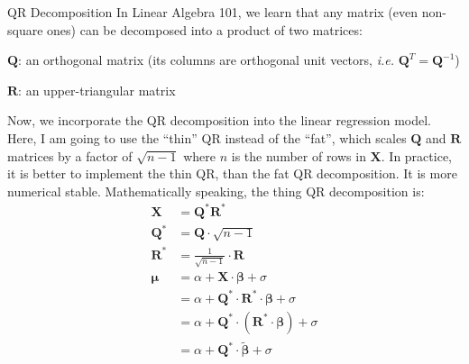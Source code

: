 \documentclass[aspectratio=169]{beamer}                    %
\begin{document}
\begin{frame}[plain, noframenumbering, label=appendixnqr]{QR Decomposition}
	\footnotesize
	In Linear Algebra 101, we learn that any matrix
	(even non-square ones) can be decomposed into a product of two matrices:
	\begin{vfilleditems}
		\footnotesize
		\item $\mathbf{Q}$: an orthogonal matrix (its columns are orthogonal unit vectors,
		\textit{i.e.} $\mathbf{Q}^T = \mathbf{Q}^{-1}$)
		\item $\mathbf{R}$: an upper-triangular matrix
	\end{vfilleditems}
	\footnotesize
	Now, we incorporate the QR decomposition into the linear regression model.
	Here, I am going to use the ``thin'' QR instead of the ``fat'', which scales $\mathbf{Q}$ and $\mathbf{R}$
	matrices by a factor of $\sqrt{n-1}$ where $n$ is the number of rows in $\mathbf{X}$.
	In practice, it is better to implement the thin QR, than the fat QR decomposition.
	It is more numerical stable. Mathematically speaking, the thing QR decomposition is:
	$$
		\begin{aligned}
			\mathbf{X}       & = \mathbf{Q}^* \mathbf{R}^*                                                    \\
			\mathbf{Q}^*     & = \mathbf{Q} \cdot \sqrt{n - 1}                                                \\
			\mathbf{R}^*     & = \frac{1}{\sqrt{n - 1}} \cdot \mathbf{R}                                      \\
			\boldsymbol{\mu} & = \alpha + \mathbf{X} \cdot \boldsymbol{\beta} + \sigma                        \\
			                 & = \alpha + \mathbf{Q}^* \cdot \mathbf{R}^* \cdot \boldsymbol{\beta} + \sigma   \\
			                 & = \alpha + \mathbf{Q}^* \cdot (\mathbf{R}^* \cdot \boldsymbol{\beta}) + \sigma \\
			                 & = \alpha + \mathbf{Q}^* \cdot \widetilde{\boldsymbol{\beta}} + \sigma
		\end{aligned}
	$$
\end{frame}
\end{document}
